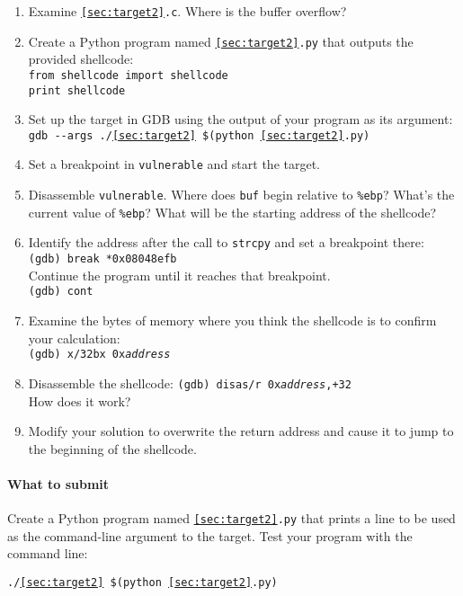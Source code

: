 \documentclass[letterpaper,12pt]{report}
\begin{document}
{\begin{enumerate}
\item Examine \texttt{\ref{sec:target2}.c}.  Where is the buffer overflow?
\item Create a Python program named \texttt{\ref{sec:target2}.py} that outputs the provided shellcode:\\
\texttt{from shellcode import shellcode}\\
\texttt{print shellcode}
\item Set up the target in GDB using the output of your program as its argument:\\
\texttt{gdb -{}-args ./\ref{sec:target2} \$(python \ref{sec:target2}.py)}
\item Set a breakpoint in \texttt{vulnerable} and start the target.
\item Disassemble \texttt{vulnerable}.  Where does \texttt{buf} begin relative to \texttt{\%ebp}?  What's the current value of \texttt{\%ebp}?  What will be the starting address of the shellcode?
\item Identify the address after the call to \texttt{strcpy} and set a breakpoint there:\\
\texttt{(gdb) break *0x08048efb}\\
Continue the program until it reaches that breakpoint.\\
\texttt{(gdb) cont}
\item Examine the bytes of memory where you think the shellcode is to confirm your calculation:\\
\texttt{(gdb) x/32bx 0x\emph{address}}
\item Disassemble the shellcode:  \texttt{(gdb) disas/r 0x\emph{address},+32}\\
  How does it work?
\item Modify your solution to overwrite the return address and cause it to jump to the beginning of the shellcode.
\end{enumerate}

\paragraph{What to submit}
Create a Python program named \texttt{\ref{sec:target2}.py} that prints a line to be used as the command-line argument to the target.  Test your program with the command line:

\smallskip

\quad\texttt{./\ref{sec:target2} \$(python \ref{sec:target2}.py)}

}
\end{document}
